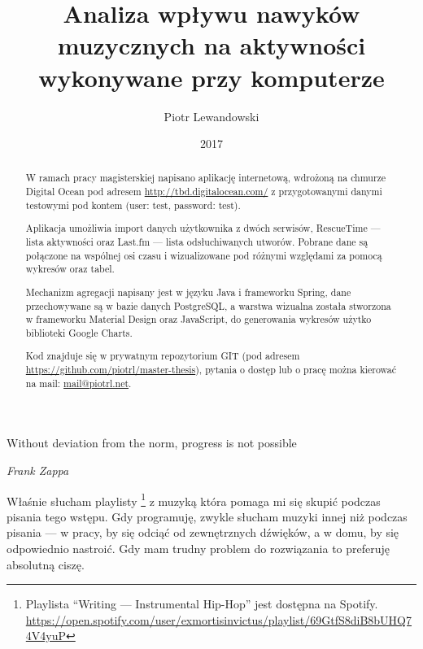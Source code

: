 \documentclass[openright]{xmgr}
\author   {Piotr Lewandowski}
\title    {Analiza wpływu nawyków muzycznych na aktywności wykonywane przy komputerze}
\date     {2017}
\begin{document}
\begin{abstract}
    W ramach pracy magisterskiej napisano aplikację internetową,
    wdrożoną na chmurze Digital Ocean pod adresem \url{http://tbd.digitalocean.com/}
    z przygotowanymi danymi testowymi pod kontem (user: test, password: test).

    Aplikacja umożliwia import danych użytkownika z dwóch serwisów,
    RescueTime — lista aktywności oraz
    Last.fm — lista odsłuchiwanych utworów.
    Pobrane dane są połączone na wspólnej osi czasu i wizualizowane pod różnymi względami za pomocą wykresów oraz tabel.

    Mechanizm agregacji napisany jest w języku Java i frameworku Spring,
    dane przechowywane są w bazie danych PostgreSQL,
    a warstwa wizualna została stworzona w frameworku Material Design oraz JavaScript,
    do generowania wykresów użytko biblioteki Google Charts.

    Kod znajduje się w prywatnym repozytorium GIT (pod adresem \url{https://github.com/piotrl/master-thesis}),
    pytania o dostęp lub o pracę można kierować na mail: \url{mail@piotrl.net}.
\end{abstract}


\maketitle

\introduction

\epigraph{Without deviation from the norm, progress is not possible}{\textit{Frank Zappa}}

    Właśnie słucham playlisty
    \footnote{Playlista ``Writing --- Instrumental Hip-Hop'' jest dostępna na Spotify.
    \url{https://open.spotify.com/user/exmortisinvictus/playlist/69GtfS8diB8bUHQ74V4yuP}}
    z muzyką która pomaga mi się skupić podczas pisania tego wstępu.
    Gdy programuję, zwykle słucham muzyki innej niż podczas pisania ---
    w pracy, by się odciąć od zewnętrznych dźwięków, a w domu, by się odpowiednio nastroić.
    Gdy mam trudny problem do rozwiązania to preferuję absolutną ciszę.
\end{document}
